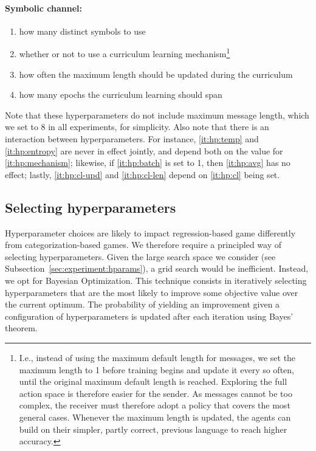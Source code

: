 \documentclass[twocolumn]{article}
\begin{document}
\paragraph{Symbolic channel:}
\begin{enumerate}[resume*]
    \vspace*{-0.5em}
    \itemsep-0.25em 
    \item how many distinct symbols to use
    \item \label{it:hp:cl} whether or not to use a curriculum learning mechanism\footnote{
        I.e., instead of using the maximum default length for messages, we set the maximum length to 1 before training begins and update it every so often, until the original maximum default length is reached. 
        Exploring the full action space is therefore easier for the sender.
        As messages cannot be too complex, the receiver must therefore adopt a policy that covers the most general cases.
        Whenever the maximum length is updated, the agents can build on their simpler, partly correct, previous language to reach higher accuracy.
    }
    \item \label{it:hp:cl-upd} how often the maximum length should be updated during the curriculum
    \item \label{it:hp:cl-len} how many epochs the curriculum learning should span
\end{enumerate}

Note that these hyperparameters do not include maximum message length, which we set to 8 in all experiments, for simplicity.
Also note that there is an interaction between hyperparameters.
For instance, \ref{it:hp:temp} and \ref{it:hp:entropy} are never in effect jointly, and depend both on the value for \ref{it:hp:mechanism}; likewise, if \ref{it:hp:batch} is set to 1, then \ref{it:hp:avg} has no effect; lastly, \ref{it:hp:cl-upd} and \ref{it:hp:cl-len} depend on \ref{it:hp:cl} being set.

\subsection{Selecting hyperparameters} \label{sec:experiment:bayes-opt}

Hyperparameter choices are likely to impact regression-based game differently from categorization-based games. %
We therefore require a principled way of selecting hyperparameters. %
Given the large search space we consider (see Subsection~\ref{sec:experiment:hparams}), a grid search would be inefficient.
Instead, we opt for Bayesian Optimization. 
This technique consists in iteratively selecting hyperparameters that are the most likely to improve some objective value over the current optimum.
The probability of yielding an improvement given a configuration of hyperparameters is updated after each iteration using Bayes' theorem.
\end{document}
